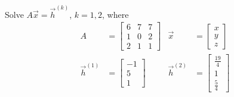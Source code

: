 \begin{Exercise}
Solve $A\vec{x} = \vec{h}^{(k)}$, $k=1,2$, where
\begin{align*}
A &=
\begin{bmatrix}
6 & 7 & 7\\
1 & 0 & 2\\
2 & 1 & 1
\end{bmatrix}
&\vec{x} &=
\begin{bmatrix}
x\\
y\\
z
\end{bmatrix} \\
\vec{h}^{(1)} &=
\begin{bmatrix}
-1 \\
5 \\
1
\end{bmatrix}
& \vec{h}^{(2)} &=
\begin{bmatrix}
\frac{19}{4} \\
1 \\
\frac{5}{4}
\end{bmatrix}
\end{align*}
\end{Exercise}
